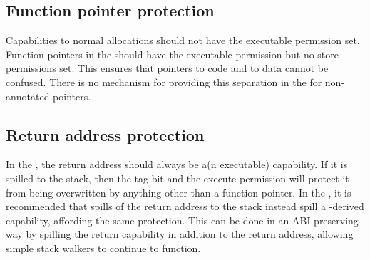 \subsection{Function pointer protection}

Capabilities to normal allocations should not have the executable permission set.
Function pointers in the \sandboxABI{} should have the executable permission but no store permissions set.
This ensures that pointers to code and to data cannot be confused.
There is no mechanism for providing this separation in the \hybridABI{} for non-annotated pointers.

\subsection{Return address protection}

In the \sandboxABI{}, the return address should always be a(n executable) capability.
If it is spilled to the stack, then the tag bit and the execute permission will protect it from being overwritten by anything other than a function pointer.
In the \hybridABI{}, it is recommended that spills of the return address to the stack instead spill a \PCC{}-derived capability, affording the same protection.
This can be done in an ABI-preserving way by spilling the return capability in addition to the return address, allowing simple stack walkers to continue to function.

